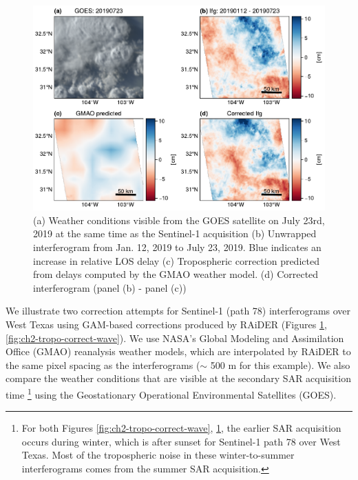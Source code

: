 

\begin{figure}
	\centering
	\includegraphics[width=1.0\textwidth]{figures/chapter2-sar/figure_tropo_correct_storm.pdf}
	\caption[West Texas tropospheric correction attempt for thunderstorm]{
		(a) Weather conditions visible from the GOES satellite on July 23rd, 2019 at the same time as the Sentinel-1 acquisition
		(b) Unwrapped interferogram from Jan. 12, 2019 to July 23, 2019. Blue indicates an increase in relative LOS delay
		(c) Tropospheric correction predicted from delays computed by the GMAO weather model.
		(d) Corrected interferogram (panel (b) - panel (c))
	}
	\label{fig:ch2-tropo-correct-storm}
\end{figure}

We illustrate two correction attempts for Sentinel-1 (path 78) interferograms over West Texas using GAM-based corrections produced by RAiDER (Figures \ref{fig:ch2-tropo-correct-storm}, \ref{fig:ch2-tropo-correct-wave}). 
We use NASA's Global Modeling and Assimilation Office (GMAO) reanalysis weather models, which are interpolated by RAiDER to the same pixel spacing as the interferograms ($\sim$ 500 m for this example). We also compare the weather conditions that are visible at the secondary SAR acquisition time \footnote{For both Figures \ref{fig:ch2-tropo-correct-wave}, \ref{fig:ch2-tropo-correct-storm}, the earlier SAR acquisition occurs during winter, which is after sunset for Sentinel-1 path 78 over West Texas. Most of the tropospheric noise in these winter-to-summer interferograms comes from the summer SAR acquisition.} using the Geostationary Operational Environmental Satellites (GOES).


